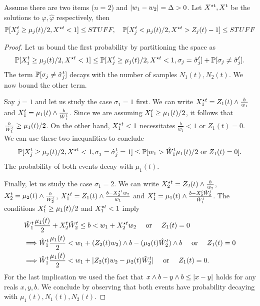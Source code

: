 \begin{lemma}
Assume there are two items ($n=2$)  and $\lvert w_1-w_2\rvert=\Delta>0$.
Let $X^{\star t},X^t$ be the solutions to $\varphi,\hat\varphi$ respectively, then
\[
\mathbb{P}[X^t_j\geq \mu_j(t)/2, X^{\star t}<1] \leq STUFF, \quad 
\mathbb{P}[X^t_j< \mu_j(t)/2, X^{\star t}>Z_j(t)-1]\leq STUFF
\]
\end{lemma}
\begin{proof}
Let us bound the first probability by partitioning the space as
\[
\mathbb{P}[X^t_j\geq \mu_j(t)/2, X^{\star t}<1] \leq \mathbb{P}[X^t_j\geq \mu_j(t)/2, X^{\star t}<1, \sigma_j=\hat\sigma^t_j] + \mathbb{P}[\sigma_j\neq\hat\sigma^t_j].
\]
The term $\mathbb{P}[\sigma_j\neq\hat\sigma^t_j]$ decays with the number of samples $N_1(t),N_2(t)$.
We now bound the other term.

Say $j=1$ and let us study the case $\sigma_1=1$ first.
We can write $X^{\star t}_1 = Z_1(t)\land \frac{b}{w_1}$ and $X^t_1 = \mu_1(t)\land \frac{b}{\hat W^t_1}$.
Since we are assuming $X^t_1\geq \mu_1(t)/2$, it follows that $\frac{b}{\hat W^t_1}\geq \mu_1(t)/2$.
On the other hand, $X^{\star t}_1<1$ necessitates $\frac{b}{w_1}<1$ or $Z_1(t)=0$.
We can use these two inequalities to conclude
\[
\mathbb{P}[X^t_j\geq \mu_j(t)/2, X^{\star t}<1, \sigma_j=\hat\sigma^t_j=1] \leq \mathbb{P}[ w_1> \hat W^t_1 \mu_1(t)/2 \text{ or }  Z_1(t)=0].
\]
The probability of both events decay with $\mu_1(t)$.

Finally, let us study the case $\sigma_1=2$.
We can write $X^{\star t}_2 = Z_2(t)\land \frac{b}{w_2}$, $X^t_2 = \mu_2(t)\land \frac{b}{\hat W^t_2}$, $X^{\star t}_1 = Z_1(t)\land \frac{b-X^{\star t}_2w_2}{w_1}$ and $X^t_1 = \mu_1(t)\land \frac{b-X^t_2\hat W^t_2}{\hat W^t_1}$.
The conditions $X^t_1\geq \mu_1(t)/2$ and $X^{\star t}_1<1$ imply
\begin{align*}
& \hat W^t_1\frac{\mu_1(t)}{2}+X^t_2\hat W^t_2\leq b < w_1+X^{\star t}_2w_2 \quad \text{ or } \quad Z_1(t)=0\\
&\Longrightarrow \hat W^t_1\frac{\mu_1(t)}{2}< w_1+ (Z_2(t)w_2)\land b - (\mu_2(t)\hat W^t_2)\land b \quad \text{ or } \quad Z_1(t)=0 \\
&\Longrightarrow \hat W^t_1\frac{\mu_1(t)}{2}< w_1+ \lvert Z_2(t)w_2 -\mu_2(t)\hat W^t_2\rvert \quad \text{ or } \quad Z_1(t)=0.
\end{align*}
For the last implication we used the fact that $x\land b - y\land b \leq \lvert x-y\rvert$ holds for any reals $x,y,b$.
We conclude by observing that both events have probability decaying with $\mu_1(t),N_1(t),N_2(t)$.
\end{proof}